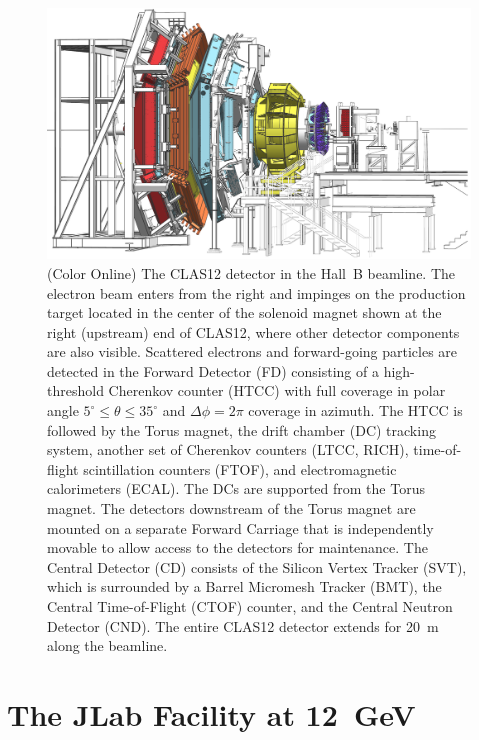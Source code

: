 \documentclass[final,3p,twocolumn]{elsarticle}
\begin{document}
\begin{figure}[t]
\centering
\centerline{\includegraphics[width=1.8\columnwidth]{CLAS12-side-3.png}}
\caption{(Color Online) The CLAS12 detector in the Hall~B beamline. The electron beam enters from the right and impinges on
the production target located in the center of the solenoid magnet shown at the right (upstream) end of CLAS12,
where other detector components are also visible. Scattered electrons and forward-going particles are detected
in the Forward Detector (FD) consisting of a high-threshold Cherenkov counter (HTCC) with full coverage in polar
angle $5^\circ \le \theta \le 35^\circ$ and $\Delta \phi = 2\pi$ coverage in azimuth. The HTCC is followed by the
Torus magnet, the drift chamber (DC) tracking system, another set of Cherenkov counters (LTCC, RICH),
time-of-flight scintillation counters (FTOF), and electromagnetic calorimeters (ECAL). The DCs are supported from
the Torus magnet. The detectors downstream of the Torus magnet are mounted on a separate Forward Carriage that
is independently movable to allow access to the detectors for maintenance. The Central Detector (CD) consists of the
Silicon Vertex Tracker (SVT), which is surrounded by a Barrel Micromesh Tracker (BMT), the Central Time-of-Flight
(CTOF) counter, and the Central Neutron Detector (CND). The entire CLAS12 detector extends for 20~m along the
beamline.} 
\label{clas12}
\end{figure}

\section{The JLab Facility at 12~GeV}
\label{jlab}
\end{document}
